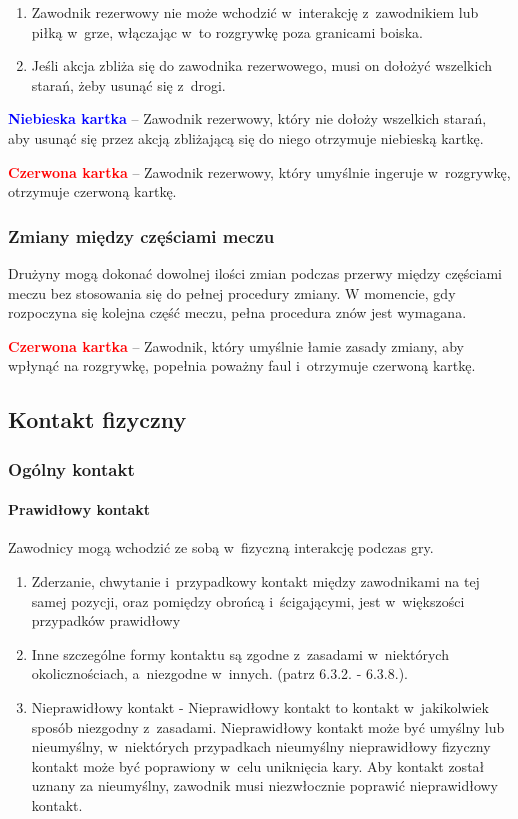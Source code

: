 \documentclass[12pt]{article}
\newcommand\redcard[1]{\bgroup\textcolor{red}{\textbf{#1}}}
\newcommand\bluecard[1]{\bgroup\textcolor{blue}{\textbf{#1}}}
\begin{document}
\begin{enumerate}
	\item
	      Zawodnik rezerwowy nie może wchodzić w~interakcję z~zawodnikiem lub
	      piłką w~grze, włączając w~to rozgrywkę poza granicami boiska.
	\item
	      Jeśli akcja zbliża się do zawodnika rezerwowego, musi on dołożyć
	      wszelkich starań, żeby usunąć się z~drogi.
\end{enumerate}

\bluecard{Niebieska kartka} -- Zawodnik rezerwowy, który nie dołoży wszelkich
starań, aby usunąć się przez akcją zbliżającą się do niego otrzymuje
niebieską kartkę.

\redcard{Czerwona kartka} -- Zawodnik rezerwowy, który umyślnie ingeruje w~rozgrywkę, otrzymuje czerwoną kartkę.

\subsubsection{Zmiany między częściami meczu}

Drużyny mogą dokonać dowolnej ilości zmian podczas przerwy między
częściami meczu bez stosowania się do pełnej procedury zmiany. W
momencie, gdy rozpoczyna się kolejna część meczu, pełna procedura znów
jest wymagana.

\redcard{Czerwona kartka} -- Zawodnik, który umyślnie łamie zasady zmiany,
aby wpłynąć na rozgrywkę, popełnia poważny faul i~otrzymuje czerwoną
kartkę.

\subsection{Kontakt fizyczny}

\subsubsection{Ogólny kontakt}

\paragraph{Prawidłowy kontakt}
Zawodnicy mogą wchodzić
ze sobą w~fizyczną interakcję podczas gry.

\begin{enumerate}
	\item
	      Zderzanie, chwytanie i~przypadkowy kontakt między zawodnikami na tej
	      samej pozycji, oraz pomiędzy obrońcą i~ścigającymi, jest w~większości
	      przypadków prawidłowy
	\item
	      Inne szczególne formy kontaktu są zgodne z~zasadami w~niektórych
	      okolicznościach, a~niezgodne w~innych. (patrz 6.3.2. - 6.3.8.).
	\item
	      Nieprawidłowy kontakt - Nieprawidłowy kontakt to kontakt w~jakikolwiek
	      sposób niezgodny z~zasadami. Nieprawidłowy kontakt może być umyślny
	      lub nieumyślny, w~niektórych przypadkach nieumyślny nieprawidłowy
	      fizyczny kontakt może być poprawiony w~celu uniknięcia kary. Aby
	      kontakt został uznany za nieumyślny, zawodnik musi niezwłocznie
	      poprawić nieprawidłowy kontakt.
\end{enumerate}
\end{document}
